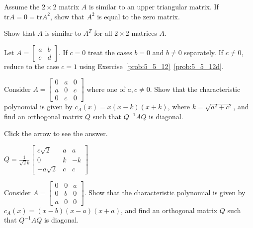 \documentclass{ximera}
\begin{document}
\begin{problem}
Assume the $2 \times 2$ matrix $A$ is similar to an upper triangular matrix. If $\mbox{tr} A = 0 = \mbox{tr} A^{2}$, show that $A^{2}$ is equal to the zero matrix.
\end{problem}

\begin{problem}
Show that $A$ is similar to $A^{T}$ for all $2 \times 2$ matrices $A$. 
\begin{hint}
Let $A =\begin{bmatrix}
a & b \\
c & d
\end{bmatrix}$. If $c = 0$ treat the cases $b = 0$ and $b \neq 0$ separately. If $c \neq 0$, reduce to the case $c = 1$ using Exercise~\ref{prob:5_5_12}~\ref{prob:5_5_12d}.
\end{hint}
\end{problem}

\begin{problem}\label{prob:ortho11}
Consider $A = \begin{bmatrix}
0 & a & 0 \\
a & 0 & c \\
0 & c & 0
\end{bmatrix}$
 where one of $a, c \neq 0$. Show that the characteristic polynomial is given by $c_{A}(x) = x(x - k)(x + k)$, where $k = \sqrt{a^2 + c^2}$, and find an orthogonal matrix $Q$ such that $Q^{-1}AQ$ is diagonal.

Click the arrow to see the answer.
\begin{expandable}
$Q = \frac{1}{\sqrt{2}k}\begin{bmatrix}
c\sqrt{2} & a & a \\
0 & k & -k \\
-a\sqrt{2} & c & c
\end{bmatrix}$
\end{expandable}
\end{problem}

\begin{problem}\label{prob:ortho12}
Consider $A = \begin{bmatrix}
0 & 0 & a \\
0 & b & 0 \\
a & 0 & 0
\end{bmatrix}$. Show that the characteristic polynomial is given by $c_{A}(x) = (x - b)(x - a)(x + a)$, and find an orthogonal matrix $Q$ such that $Q^{-1}AQ$ is diagonal.
\end{problem}
\end{document}
